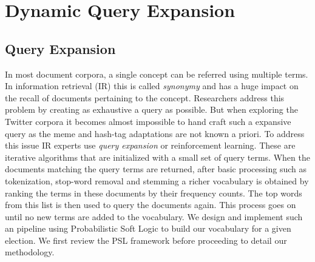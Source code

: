 \chapter{Dynamic Query Expansion}
\section{Query Expansion}
In most document corpora, a single concept can be referred using multiple terms.
In information retrieval (IR) this is called \emph{synonymy} and has a huge impact on the recall of documents pertaining to the concept.
Researchers address this problem by creating as exhaustive a query as possible. 
But when exploring the Twitter corpora it becomes almost impossible to hand craft such a expansive query as the meme and hash-tag adaptations are not known a priori. 
\newline
To address this issue IR experts use \emph{query expansion} or reinforcement learning.
These are iterative algorithms that are initialized with a small set of query terms. 
When the documents matching the query terms are returned, after basic  processing such as tokenization, stop-word removal and stemming a richer vocabulary is obtained by ranking the terms in these documents by their frequency counts.
The top words from this list is then used to query the documents again. 
This process goes on until no new terms are added to the vocabulary. 
We design and implement such an pipeline using Probabilistic Soft Logic to build our vocabulary for a given election. 
We first review the PSL framework before proceeding to detail our methodology.
